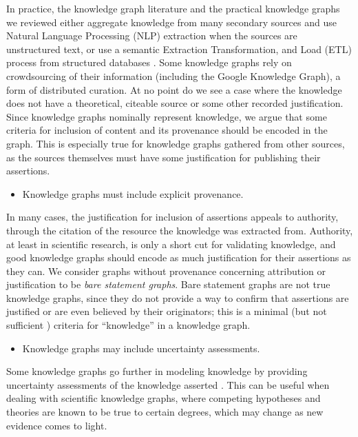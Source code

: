 In practice, the knowledge graph literature and the practical knowledge graphs we reviewed either aggregate knowledge from many secondary sources and use Natural Language Processing (NLP) extraction when the sources are unstructured text, or use a semantic Extraction Transformation, and Load (ETL) process from structured databases \cite{McCusker_2009}.
Some knowledge graphs rely on crowdsourcing of their information (including the Google Knowledge Graph), a form of distributed curation.
At no point do we see a case where the knowledge does not have a theoretical, citeable source or some other recorded justification.
Since knowledge graphs nominally represent knowledge, we argue that some criteria for inclusion of content and its provenance should be encoded in the graph.
This is especially true for knowledge graphs gathered from other sources, as the sources themselves must have some justification for publishing their assertions.
\begin {itemize}
\item Knowledge graphs must include explicit provenance.
\end {itemize}
In many cases, the justification for inclusion of assertions appeals to authority, through the citation of the resource the knowledge was extracted from.
Authority, at least in scientific research, is only a short cut for validating knowledge, and good knowledge graphs should encode as much justification for their assertions as they can.
We consider graphs without provenance concerning attribution or justification to be {\em bare statement graphs}. Bare statement graphs are not true knowledge graphs, since they do not provide a way to confirm that assertions are justified or are even believed by their originators; this is a minimal (but not sufficient \cite{Gettier_1963}) criteria for ``knowledge'' in a knowledge graph.

\begin {itemize}
\item Knowledge graphs may include uncertainty assessments.
\end {itemize}

Some knowledge graphs go further in modeling knowledge by providing uncertainty assessments of the knowledge asserted \cite{Dong_2014}.
This can be useful when dealing with scientific knowledge graphs, where competing hypotheses and theories are known to be true to certain degrees, which may change as new evidence comes to light.

